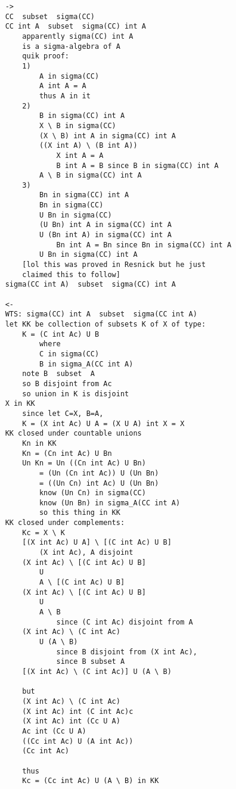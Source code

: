 \documentclass{article}
\begin{document}
\begin{flushleft}
\begin{verbatim}
    ->
    CC  subset  sigma(CC)
    CC int A  subset  sigma(CC) int A 
        apparently sigma(CC) int A
        is a sigma-algebra of A 
        quik proof:
        1) 
            A in sigma(CC)
            A int A = A
            thus A in it 
        2)
            B in sigma(CC) int A 
            X \ B in sigma(CC)
            (X \ B) int A in sigma(CC) int A
            ((X int A) \ (B int A)) 
                X int A = A 
                B int A = B since B in sigma(CC) int A
            A \ B in sigma(CC) int A
        3)
            Bn in sigma(CC) int A
            Bn in sigma(CC)
            U Bn in sigma(CC)
            (U Bn) int A in sigma(CC) int A
            U (Bn int A) in sigma(CC) int A 
                Bn int A = Bn since Bn in sigma(CC) int A
            U Bn in sigma(CC) int A
        [lol this was proved in Resnick but he just 
        claimed this to follow]
    sigma(CC int A)  subset  sigma(CC) int A

    <-
    WTS: sigma(CC) int A  subset  sigma(CC int A)
    let KK be collection of subsets K of X of type:
        K = (C int Ac) U B
            where 
            C in sigma(CC)
            B in sigma_A(CC int A)
        note B  subset  A
        so B disjoint from Ac 
        so union in K is disjoint 
    X in KK 
        since let C=X, B=A,
        K = (X int Ac) U A = (X U A) int X = X
    KK closed under countable unions 
        Kn in KK 
        Kn = (Cn int Ac) U Bn 
        Un Kn = Un ((Cn int Ac) U Bn)
            = (Un (Cn int Ac)) U (Un Bn)
            = ((Un Cn) int Ac) U (Un Bn)
            know (Un Cn) in sigma(CC)
            know (Un Bn) in sigma_A(CC int A)
            so this thing in KK 
    KK closed under complements:
        Kc = X \ K
        [(X int Ac) U A] \ [(C int Ac) U B]
            (X int Ac), A disjoint 
        (X int Ac) \ [(C int Ac) U B]  
            U 
            A \ [(C int Ac) U B]
        (X int Ac) \ [(C int Ac) U B]  
            U 
            A \ B
                since (C int Ac) disjoint from A
        (X int Ac) \ (C int Ac)  
            U (A \ B)
                since B disjoint from (X int Ac),
                since B subset A
        [(X int Ac) \ (C int Ac)] U (A \ B)

        but 
        (X int Ac) \ (C int Ac)
        (X int Ac) int (C int Ac)c
        (X int Ac) int (Cc U A)
        Ac int (Cc U A)
        ((Cc int Ac) U (A int Ac))
        (Cc int Ac)

        thus 
        Kc = (Cc int Ac) U (A \ B) in KK 
    

\end{verbatim}
\end{flushleft}
\end{document}
